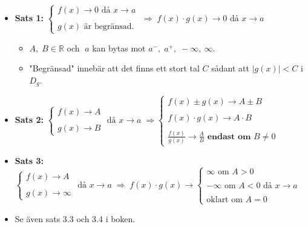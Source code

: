 \documentclass[swedish]{article}
\begin{document}
\begin{itemize} 
    \item{\textbf{Sats 1:} $\left\{ \begin{array}{l}
            f(x) \to 0 \text{ då } x \to a\\
            \\
            g(x) \text{ är begränsad.}
    \end{array} \right. \; \Rightarrow \; f(x) \cdot g(x) \to 0 \text{ då } x \to a$}
        \begin{itemize}    
            \item{$A, \; B\in \mathbb{R}$ och $\; a$ kan bytas mot $a^-, \; a^+, \; - \infty, \ \infty$.}
            \item{"Begränsad" innebär att det finns ett stort tal $C$ sådant att $|g(x)| < C$ i $D_g$.}
        \end{itemize}
    \item{\textbf{Sats 2:} $\left\{ \begin{array}{l}
            f(x) \to A\\
            \\
            g(x) \to B
    \end{array} \right. \text{ då } x \to a \; \Rightarrow \left\{ \begin{array}{l}
            f(x) \pm g(x) \to A \pm B\\
            \\
            f(x) \cdot g(x) \to A \cdot B\\
            \\
            \frac{f(x)}{g(x)} \to \frac{A}{B} \textbf{ endast om $B \neq 0$}
        \end{array} \right.$}
        \bigbreak
    \item{\textbf{Sats 3:} $\left\{ \begin{array}{l}
            f(x) \to A\\
            \\
            g(x) \to \infty
    \end{array} \right. \text{ då } x \to a \; \Rightarrow \; f(x) \cdot g(x) \to \left\{ \begin{array}{l}
        \infty \text{ om } A>0\\
        \\
        - \infty \text{ om } A<0 \text{ då } x \to a\\
        \\
        \text{oklart om } A = 0
    \end{array} \right.$}
    \item{Se även sats 3.3 och 3.4 i boken.}
\end{itemize}
\end{document}
